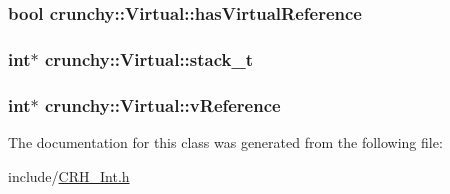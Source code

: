 \subsubsection[{has\+Virtual\+Reference}]{\setlength{\rightskip}{0pt plus 5cm}bool crunchy\+::\+Virtual\+::has\+Virtual\+Reference}\hypertarget{classcrunchy_1_1_virtual_a9dd9b11712ab44b00696838fc1da2c43}{}\label{classcrunchy_1_1_virtual_a9dd9b11712ab44b00696838fc1da2c43}
\subsubsection[{stack\+\_\+t}]{\setlength{\rightskip}{0pt plus 5cm}int$\ast$ crunchy\+::\+Virtual\+::stack\+\_\+t\hspace{0.3cm}{\ttfamily [static]}}\hypertarget{classcrunchy_1_1_virtual_ad108e31577fcad0d6ff9ff6d7b3d5249}{}\label{classcrunchy_1_1_virtual_ad108e31577fcad0d6ff9ff6d7b3d5249}
\subsubsection[{v\+Reference}]{\setlength{\rightskip}{0pt plus 5cm}int$\ast$ crunchy\+::\+Virtual\+::v\+Reference}\hypertarget{classcrunchy_1_1_virtual_acf317286283a3916ccb1d4752074af5f}{}\label{classcrunchy_1_1_virtual_acf317286283a3916ccb1d4752074af5f}


The documentation for this class was generated from the following file\+:\begin{DoxyCompactItemize}
\item 
include/\hyperlink{_c_r_h___int_8h}{C\+R\+H\+\_\+\+Int.\+h}\end{DoxyCompactItemize}

